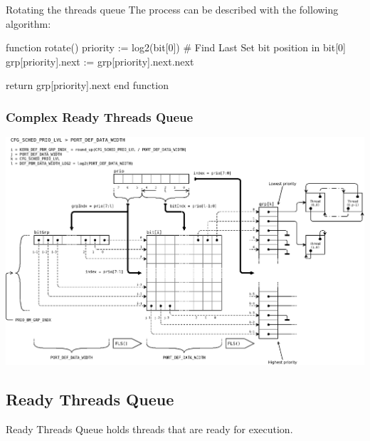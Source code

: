 \begin{DoxyParagraph}{Rotating the threads queue}
The process can be described with the following algorithm\-: 
\begin{DoxyCode}
\textcolor{keyword}{function} rotate()
    priority := log2(bit[0])                                \textcolor{preprocessor}{# Find Last Set bit position in bit[0]}
\textcolor{preprocessor}{}
    grp[priority].next := grp[priority].next.next

    \textcolor{keywordflow}{return} grp[priority].next
end \textcolor{keyword}{function}
\end{DoxyCode}
 
\end{DoxyParagraph}
\hypertarget{scheduler_sched_rdyThdQ_complex}{}\subsubsection{Complex Ready Threads Queue}\label{scheduler_sched_rdyThdQ_complex}

\begin{DoxyImage}
\includegraphics[width=17cm]{thdQ-complex.png}
\caption{Ready Threads Queue -\/ high number of priority levels}
\end{DoxyImage}
\hypertarget{scheduler_sched_rdyThdQ}{}\subsection{Ready Threads Queue}\label{scheduler_sched_rdyThdQ}
Ready Threads Queue holds threads that are ready for execution. 